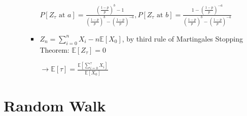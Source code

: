 \documentclass[a4paper]{article}
\begin{document}
\begin{itemize}
\begin{itemize}
\begin{itemize}
                        $P[Z_\tau \text{ at }a ] = \frac{(\frac{1-p}{p})^{b}-1}{(\frac{1-p}{p})^b - (\frac{1-p}{p})^{-a}}, P[Z_\tau \text{ at }b ] = \frac{1-(\frac{1-p}{p})^{-a}}{(\frac{1-p}{p})^b - (\frac{1-p}{p})^{-a}}$
                    \item $Z_n = \sum_{i=0}^n X_i - n \mathbb{E}[X_0]$, by third rule of Martingales Stopping Theorem: $\mathbb{E}[Z_\tau] = 0$

                        $\rightarrow \mathbb{E}[\tau] = \frac{\mathbb{E}[\sum_{i=0}^\tau X_i]}{\mathbb{E}[X_0]}$
                \end{itemize}
        \end{itemize}
\end{itemize}

\section{Random Walk}
\end{document}
